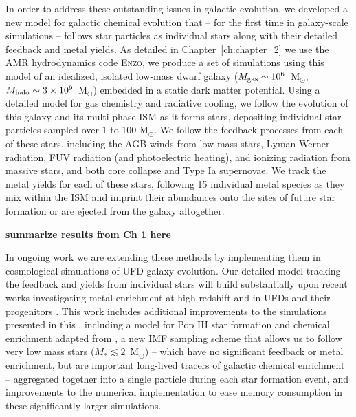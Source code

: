 In order to address these outstanding issues in galactic evolution, we developed a new model for galactic chemical evolution that -- for the first time in galaxy-scale simulations -- follows star particles as individual stars along with their detailed feedback and metal yields. As detailed in Chapter~\ref{ch:chapter_2} we use the AMR hydrodynamics code \textsc{Enzo}, we produce a set of simulations using this model of an idealized, isolated low-mass dwarf galaxy ($M_{\rm gas} \sim 10^{6}$~M$_{\odot}$, $M_{\rm halo} \sim 3 \times 10^{9}$~M$_{\odot}$) embedded in a static dark matter potential. Using a detailed model for gas chemistry and radiative cooling, we follow the evolution of this galaxy and its multi-phase ISM as it forms stars, depositing individual star particles sampled over 1 to 100 M$_{\odot}$. We follow the feedback processes from each of these stars, including the AGB winds from low mass stars, Lyman-Werner radiation, FUV radiation (and photoelectric heating), and ionizing radiation from massive stars, and both core collapse and Type Ia supernovae. We track the metal yields for each of these stars, following 15 individual metal species as they mix within the ISM and imprint their abundances onto the sites of future star formation or are ejected from the galaxy altogether.

\textbf{summarize results from Ch 1 here}

In ongoing work we are extending these methods by implementing them in cosmological simulations of UFD galaxy evolution. Our detailed model tracking the feedback and yields from individual stars will build substantially upon recent works investigating metal enrichment at high redshift and in UFDs and their progenitors \citep[e.g.][]{Ritter2015,Jeon2017,Corlies2018}. This work includes additional improvements to the simulations presented in this \dissertation, including a model for Pop III star formation and chemical enrichment adapted from \cite{Wise2012a}, a new IMF sampling scheme that allows us to follow very low mass stars ($M_* \lesssim 2$~M$_{\odot}$) -- which have no significant feedback or metal enrichment, but are important long-lived tracers of galactic chemical enrichment -- aggregated together into a single particle during each star formation event, and improvements to the numerical implementation to ease memory consumption in these significantly larger simulations.

